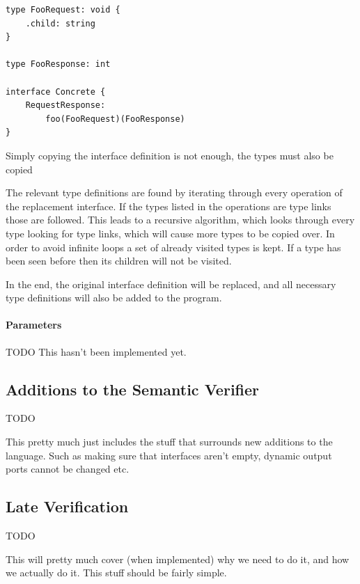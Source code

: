\begin{listing}[H]
\begin{verbatim}
type FooRequest: void {
    .child: string
}

type FooResponse: int

interface Concrete {
    RequestResponse:
        foo(FooRequest)(FooResponse)
}
\end{verbatim}

\caption{Simply copying the interface definition is not enough, the types must
    also be copied}

\label{lst:interface_rebinding_types}
\end{listing}

The relevant type definitions are found by iterating through every operation of
the replacement interface. If the types listed in the operations are type links
those are followed. This leads to a recursive algorithm, which looks through
every type looking for type links, which will cause more types to be copied
over. In order to avoid infinite loops a set of already visited types is kept.
If a type has been seen before then its children will not be visited.

In the end, the original interface definition will be replaced, and all
necessary type definitions will also be added to the program.

\paragraph{Parameters}

TODO This hasn't been implemented yet.

\subsection{Additions to the Semantic Verifier}

TODO

This pretty much just includes the stuff that surrounds new additions to the
language. Such as making sure that interfaces aren't empty, dynamic output
ports cannot be changed etc.

\subsection{Late Verification}

TODO

This will pretty much cover (when implemented) why we need to do it, and how we
actually do it. This stuff should be fairly simple.
